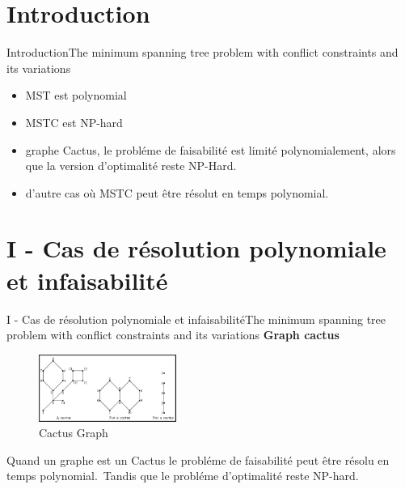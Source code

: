 \documentclass[14pt,aspectratio=169]{beamer}
\author{R. Zhang ,N. Kabadi , P. Punnen }
\title{\TT}
\date{19 Avril 2019}
\newcommand{\TT}{The minimum spanning tree problem with conflict constraints and its variations}
\newcommand{\IN}{ Introduction}
\newcommand{\PI}{I - Cas de résolution polynomiale et infaisabilité}
\begin{document}
\begin{frame}
\titlepage
\end{frame}


\begin{frame}
 \tableofcontents
\end{frame}

\section{\IN}
\begin{frame}{\IN}{\TT}
 \begin{table}
  \begin{center}
  
    \begin{itemize}
        \item MST est polynomial
        \item MSTC est NP-hard
        \item graphe Cactus, le probléme de faisabilité est limité polynomialement, alors que la version d'optimalité reste NP-Hard.
        \item d'autre cas où MSTC peut être résolut en temps polynomial.
    \end{itemize}   
  
  \end{center}
 \end{table}
\end{frame}



\section{\PI}
\begin{frame}{\PI}{\TT}\pause
 \textbf{Graph cactus} \newline
 \begin{figure}[H!]
     \centering
     \includegraphics[width=0.4\textwidth]{cactus1.png}
     \caption{Cactus Graph}
     \label{fig:my_label}
 \end{figure}
 \pause
 Quand un graphe est un Cactus le probléme de faisabilité peut être résolu en temps polynomial.\pause \newline Tandis que le probléme d'optimalité reste NP-hard.
\end{frame}
\end{document}

